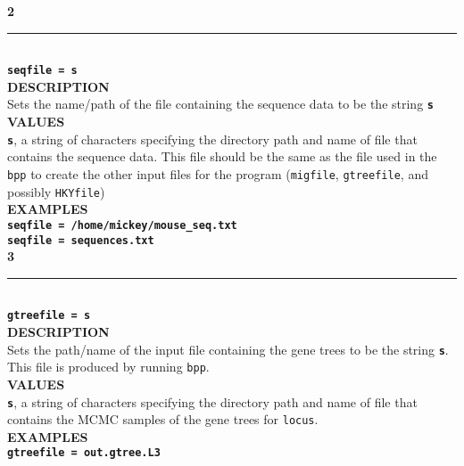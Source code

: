 \documentclass[11pt]{article}
\begin{document}
\noindent\textbf{{\large 2}} \\ 
\noindent\rule{\textwidth}{0.8pt} \\ 
\textbf{{\Large \texttt{seqfile = s}}} \vspace{5pt} \\ 
\textbf{DESCRIPTION} \vspace{5pt}\\ 
Sets the name/path of the file containing the sequence data to be the string \textbf{\texttt{s}} \vspace{5pt}\\ 
\textbf{VALUES} \vspace{5pt}\\ 
\textbf{\texttt{s}}, a string of characters specifying the directory path and name of file that contains the sequence data. 
This file should be the same as the file used in the \texttt{bpp} to create the other input files for the program (\texttt{migfile}, \texttt{gtreefile}, and possibly \texttt{HKYfile}) \vspace{5pt}\\ 
\textbf{EXAMPLES} \vspace{5pt}\\ 
\textbf{\texttt{seqfile = /home/mickey/mouse\_seq.txt}} \vspace{5pt}\\ 
\textbf{\texttt{seqfile = sequences.txt}} \vspace{10pt}\\ 

\noindent\textbf{{\large 3}} \\
\noindent\rule{\textwidth}{0.8pt} \\
\textbf{{\Large \texttt{gtreefile = s}}} \vspace{5pt}\\
\textbf{DESCRIPTION} \vspace{5pt}\\
Sets the path/name of the input file containing the gene trees to be the string \textbf{\texttt{s}}. 
This file is produced by running \texttt{bpp}. \vspace{5pt}\\
\textbf{VALUES} \vspace{5pt}\\
\textbf{\texttt{s}}, a string of characters specifying the directory path and name of file that contains the MCMC samples of the gene trees for \texttt{locus}. \vspace{5pt}\\
\textbf{EXAMPLES} \vspace{5pt}\\
\textbf{\texttt{gtreefile = out.gtree.L3}} \vspace{10pt}\\
\end{document}

